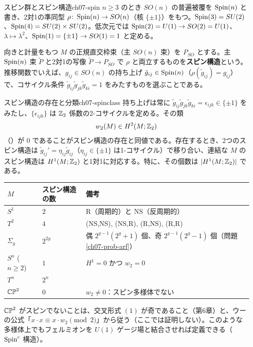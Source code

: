 \begin{mydef}{スピン群とスピン構造}{ch07-spin}
$n\ge3$ のとき $SO(n)$ の普遍被覆を $\operatorname{Spin}(n)$ と書き、2対1の準同型 $\rho\colon\operatorname{Spin}(n)\to SO(n)$（核 $\{\pm1\}$）をもつ。$\operatorname{Spin}(3)=SU(2)$、$\operatorname{Spin}(4)=SU(2)\times SU(2)$。低次元では $\operatorname{Spin}(2)=U(1)\to SO(2)=U(1)$、$\lambda\mapsto\lambda^2$、$\operatorname{Spin}(1)=\{\pm1\}\to SO(1)=1$ と定める。

向きと計量をもつ $M$ の正規直交枠束（主 $SO(n)$ 束）を $P_{SO}$ とする。主 $\operatorname{Spin}(n)$ 束 $\tilde P$ と2対1の写像 $\tilde P\to P_{SO}$ で $\rho$ と両立するものを\textbf{スピン構造}という。推移関数でいえば、$g_{ij}\in SO(n)$ の持ち上げ $\tilde g_{ij}\in\operatorname{Spin}(n)$（$\rho(\tilde g_{ij})=g_{ij}$）で、コサイクル条件 $\tilde g_{ij}\tilde g_{jk}\tilde g_{ki}=1$ をみたすものを選ぶことである。
\end{mydef}

\begin{mythm}{スピン構造の存在と分類}{ch07-spinclass}
持ち上げは常に $\tilde g_{ij}\tilde g_{jk}\tilde g_{ki}=\epsilon_{ijk}\in\{\pm1\}$ をみたし、$\{\epsilon_{ijk}\}$ は $\mathbb{Z}_2$ 係数の2-コサイクルを定める。その類
\[
w_2(M)\in H^2(M;\mathbb{Z}_2)
\]
（）が $0$ であることがスピン構造の存在と同値である。存在するとき、2つのスピン構造は $\tilde g_{ij}'=\eta_{ij}\tilde g_{ij}$（$\eta_{ij}\in\{\pm1\}$ は1-コサイクル）で移り合い、連結な $M$ のスピン構造は $H^1(M;\mathbb{Z}_2)$ と1対1に対応する。特に、その個数は $\lvert H^1(M;\mathbb{Z}_2)\rvert$ である。
\end{mythm}

\begin{center}
\renewcommand{\arraystretch}{1.2}\small
\begin{tabular}{lll}
$M$ & スピン構造の数 & 備考\\ \hline
$S^1$ & $2$ & R（周期的）と NS（反周期的）\\
$T^2$ & $4$ & (NS,NS), (NS,R), (R,NS), (R,R)\\
$\Sigma_g$ & $2^{2g}$ & 偶 $2^{g-1}(2^g+1)$ 個、奇 $2^{g-1}(2^g-1)$ 個（問題 \ref{ch07-prob-arf}）\\
$S^n$ ($n\ge2$) & $1$ & $H^1=0$ かつ $w_2=0$\\
$T^n$ & $2^n$ & \\
$\mathbb{CP}^2$ & $0$ & $w_2\neq0$：スピン多様体でない
\end{tabular}
\end{center}
$\mathbb{CP}^2$ がスピンでないことは、交叉形式 $(1)$ が奇であること（第6章）と、ウーの公式「$x\cdot x\equiv x\cdot w_2\pmod2$」から従う（ここでは証明しない）。このような多様体上でもフェルミオンを $U(1)$ ゲージ場と結合させれば定義できる（$\operatorname{Spin}^c$ 構造）。

